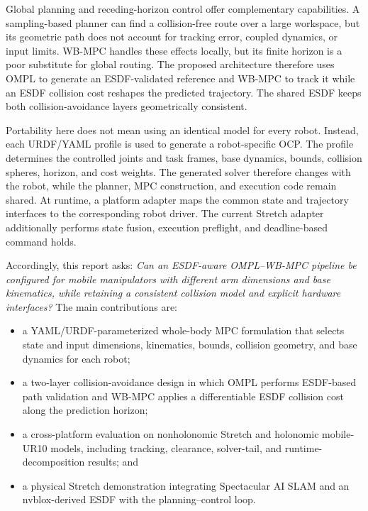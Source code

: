 \documentclass[conference]{IEEEtran}
\begin{document}
Global planning and receding-horizon control offer complementary capabilities.
A sampling-based planner can find a collision-free route over a large
workspace, but its geometric path does not account for tracking error, coupled
dynamics, or input limits.  WB-MPC handles these effects locally, but its finite
horizon is a poor substitute for global routing.  The proposed architecture
therefore uses OMPL to generate an ESDF-validated reference and WB-MPC to track
it while an ESDF collision cost reshapes the predicted trajectory.  The shared
ESDF keeps both collision-avoidance layers geometrically consistent.

Portability here does not mean using an identical model for every robot.
Instead, each URDF/YAML profile is used to generate a robot-specific OCP.  The
profile determines the controlled joints and task frames, base dynamics,
bounds, collision spheres, horizon, and cost weights.  The generated solver
therefore changes with the robot, while the planner, MPC construction, and
execution code remain shared.  At runtime, a platform adapter maps the common
state and trajectory interfaces to the corresponding robot driver.  The
current Stretch adapter additionally performs state fusion, execution
preflight, and deadline-based command holds.

Accordingly, this report asks: \emph{Can an ESDF-aware OMPL--WB-MPC pipeline be
configured for mobile manipulators with different arm dimensions and base
kinematics, while retaining a consistent collision model and explicit hardware
interfaces?}  The main contributions are:
\begin{itemize}
  \item a YAML/URDF-parameterized whole-body MPC formulation that selects state
        and input dimensions, kinematics, bounds, collision geometry, and base
        dynamics for each robot;
  \item a two-layer collision-avoidance design in which OMPL performs
        ESDF-based path validation and WB-MPC applies a differentiable ESDF
        collision cost along the prediction horizon;
  \item a cross-platform evaluation on nonholonomic Stretch and holonomic
        mobile-UR10 models, including tracking, clearance, solver-tail, and
        runtime-decomposition results; and
  \item a physical Stretch demonstration integrating Spectacular AI
        SLAM and an nvblox-derived ESDF with the planning--control loop.
\end{itemize}
\end{document}

